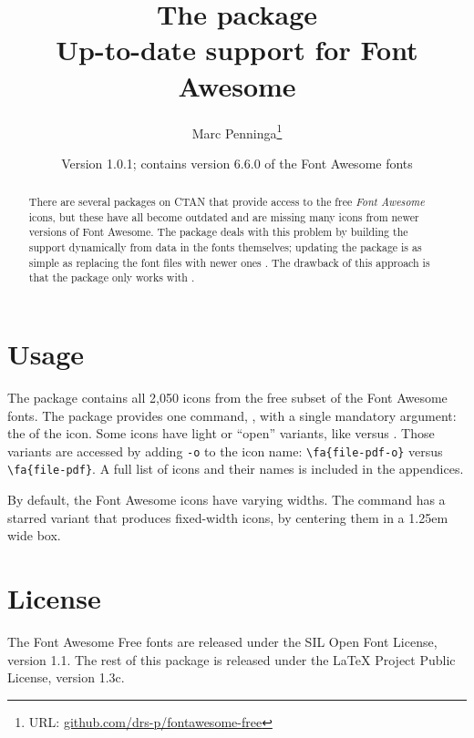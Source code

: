 \documentclass[10pt, a4paper]{ltxdoc}
\def\fileversion{1.0.1}
\begin{document}
\title{The \textsf{\jobname} package\\Up-to-date  support for Font Awesome }
\author{Marc Penninga\thanks{URL: \href{https://github.com/drs-p/fontawesome-free}{ github.com/drs-p/fontawesome-free}}}
\date{Version \fileversion; contains version 6.6.0 of the Font Awesome fonts}
\maketitle

\begin{abstract}
    There are several packages on CTAN that provide access to the free \emph{Font Awesome} icons, but these have all become outdated and are missing many icons from newer versions of Font Awesome.
    The \textsf{\jobname} package deals with this problem by building the  support dynamically from data in the fonts themselves; updating the package is as simple as replacing the font files with newer ones . The drawback of this approach is that the package only works with  .
\end{abstract}

\tableofcontents

\section{Usage}
The \textsf{\jobname} package contains all 2,050 icons from the free subset of the Font Awesome fonts. \DescribeMacro{\fa}The package provides one command, , with a single mandatory argument: the  of the icon. Some icons have light or ``open'' variants, like  versus . Those variants are accessed by adding \texttt{-o} to the icon name: \verb|\fa{file-pdf-o}| versus \verb|\fa{file-pdf}|. A full list of icons and their names is included in the appendices.

By default, the Font Awesome icons have varying widths. \DescribeMacro{\fa*}The  command has a starred variant  that produces fixed-width icons, by centering them in a 1.25em wide box.

\section*{License}
The Font Awesome Free fonts are released under the SIL Open Font License, version 1.1.
The rest of this package is released under the LaTeX Project Public License, version 1.3c.
\end{document}
